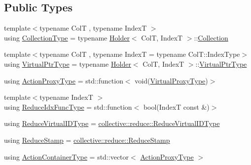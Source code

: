 \subsection*{Public Types}
\begin{DoxyCompactItemize}
\item 
{\footnotesize template$<$typename ColT , typename IndexT $>$ }\\using \hyperlink{structvt_1_1vrt_1_1collection_1_1_collection_manager_ad20a11229c9e9efe69135c207047bf85}{Collection\+Type} = typename \hyperlink{structvt_1_1vrt_1_1collection_1_1_holder}{Holder}$<$ ColT, IndexT $>$\+::\hyperlink{structvt_1_1vrt_1_1collection_1_1_collection}{Collection}
\item 
{\footnotesize template$<$typename ColT , typename IndexT  = typename Col\+T\+::\+Index\+Type$>$ }\\using \hyperlink{structvt_1_1vrt_1_1collection_1_1_collection_manager_a1da9015e52d6ecca955f57b59aab0b82}{Virtual\+Ptr\+Type} = typename \hyperlink{structvt_1_1vrt_1_1collection_1_1_holder}{Holder}$<$ ColT, IndexT $>$\+::\hyperlink{structvt_1_1vrt_1_1collection_1_1_collection_manager_a1da9015e52d6ecca955f57b59aab0b82}{Virtual\+Ptr\+Type}
\item 
using \hyperlink{structvt_1_1vrt_1_1collection_1_1_collection_manager_a98a759caf144277dcd341cdbd5538f59}{Action\+Proxy\+Type} = std\+::function$<$ void(\hyperlink{namespacevt_a1b417dd5d684f045bb58a0ede70045ac}{Virtual\+Proxy\+Type})$>$
\item 
{\footnotesize template$<$typename IndexT $>$ }\\using \hyperlink{structvt_1_1vrt_1_1collection_1_1_collection_manager_a47a3227ae0195c15187e8dc8762f66c4}{Reduce\+Idx\+Func\+Type} = std\+::function$<$ bool(IndexT const  \&)$>$
\item 
using \hyperlink{structvt_1_1vrt_1_1collection_1_1_collection_manager_ae820c8c22ae8c7350fa0232e0749b097}{Reduce\+Virtual\+I\+D\+Type} = \hyperlink{namespacevt_1_1collective_1_1reduce_a6d4ad09f8584c3ec79f46944eb773376}{collective\+::reduce\+::\+Reduce\+Virtual\+I\+D\+Type}
\item 
using \hyperlink{structvt_1_1vrt_1_1collection_1_1_collection_manager_ae8aac19e0ae07e9225142e5880eac830}{Reduce\+Stamp} = \hyperlink{namespacevt_1_1collective_1_1reduce_a7b7cb3021ac5654d92825d9fab0250b2}{collective\+::reduce\+::\+Reduce\+Stamp}
\item 
using \hyperlink{structvt_1_1vrt_1_1collection_1_1_collection_manager_a536805fb5c58b557b66e7d7febe87567}{Action\+Container\+Type} = std\+::vector$<$ \hyperlink{structvt_1_1vrt_1_1collection_1_1_collection_manager_a98a759caf144277dcd341cdbd5538f59}{Action\+Proxy\+Type} $>$

\end{DoxyCompactItemize}

